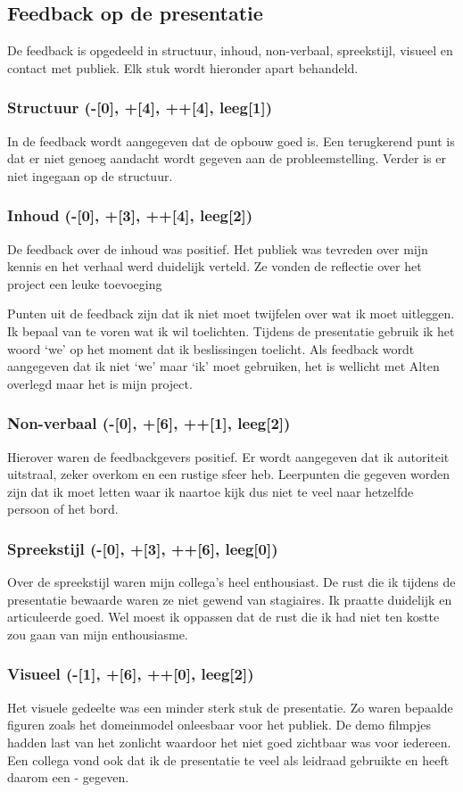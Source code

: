 \documentclass[a4paper, 11pt, oneside]{report}
\begin{document}
\subsection{Feedback op de presentatie}
De feedback is opgedeeld in structuur, inhoud, non-verbaal, spreekstijl, visueel en contact met publiek.
Elk stuk wordt hieronder apart behandeld.
\subsubsection{Structuur (-[0], +[4], ++[4], leeg[1]) }
In de feedback wordt aangegeven dat de opbouw goed is.
Een terugkerend punt is dat er niet genoeg aandacht wordt gegeven aan de probleemstelling.
Verder is er niet ingegaan op de structuur.
\subsubsection{Inhoud (-[0], +[3], ++[4], leeg[2]) }
De feedback over de inhoud was positief.
Het publiek was tevreden over mijn kennis en het verhaal werd duidelijk verteld.
Ze vonden de reflectie over het project een leuke toevoeging 

Punten uit de feedback zijn dat ik niet moet twijfelen over wat ik moet uitleggen. 
Ik bepaal van te voren wat ik wil toelichten.
Tijdens de presentatie gebruik ik het woord `we' op het moment dat ik beslissingen toelicht.
Als feedback wordt aangegeven dat ik niet `we' maar `ik' moet gebruiken, het is wellicht met Alten overlegd maar het is mijn project.
\subsubsection{Non-verbaal (-[0], +[6], ++[1], leeg[2])}
Hierover waren de feedbackgevers positief. Er wordt aangegeven dat ik autoriteit uitstraal, zeker overkom en een rustige sfeer heb. 
Leerpunten die gegeven worden zijn dat ik moet letten waar ik naartoe kijk dus niet te veel naar hetzelfde persoon of het bord.
\subsubsection{Spreekstijl (-[0], +[3], ++[6], leeg[0])}
Over de spreekstijl waren mijn collega's heel enthousiast.
De rust die ik tijdens de presentatie bewaarde waren ze niet gewend van stagiaires.
Ik praatte duidelijk en articuleerde goed.
Wel moest ik oppassen dat de rust die ik had niet ten kostte zou gaan van mijn enthousiasme. 

\subsubsection{Visueel (-[1], +[6], ++[0], leeg[2])}
Het visuele gedeelte was een minder sterk stuk de presentatie. 
Zo waren bepaalde figuren zoals het domeinmodel onleesbaar voor het publiek.
De demo filmpjes hadden last van het zonlicht waardoor het niet goed zichtbaar was voor iedereen.
Een collega vond ook dat ik de presentatie te veel als leidraad gebruikte en heeft daarom een - gegeven.
\end{document}
